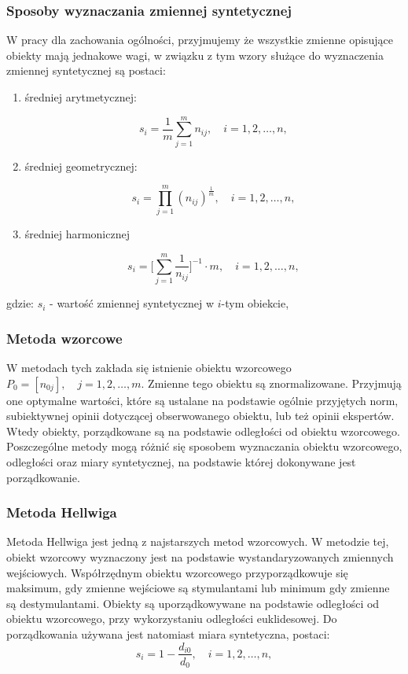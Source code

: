 \documentclass[12pt,a4paper]{report}
\begin{document}
\subsubsection{Sposoby wyznaczania zmiennej syntetycznej}
W pracy dla zachowania ogólności, przyjmujemy że wszystkie zmienne opisujące obiekty mają jednakowe wagi, w związku z tym wzory służące do wyznaczenia zmiennej syntetycznej są postaci:
\begin{enumerate}
\item średniej arytmetycznej:

$$
s_{i}=\frac{1}{m} \sum_{j=1}^{m} n_{ij},  \quad i=1, 2, \ldots, n,
$$

\item średniej geometrycznej:

$$
s_{i}=\prod_{j=1}^{m} (n_{ij})^{\frac{1}{m}}, \quad i=1, 2, \ldots, n,
$$

\item średniej harmonicznej

$$
s_{i}=\big[\sum_{j=1}^{m} \frac{1}{n_{ij}}\big]^{-1} \cdot m, \quad i=1, 2, \ldots, n,
$$

\end{enumerate}
gdzie:
$s_{i}$ - wartość zmiennej syntetycznej w $i$-tym obiekcie,

\subsubsection{Metoda wzorcowe}


W metodach tych zakłada się istnienie obiektu wzorcowego $P_{0}=[n_{0j}], \quad  j= 1,2,\ldots,m$. Zmienne tego obiektu są znormalizowane. Przyjmują one optymalne wartości, które są ustalane na podstawie ogólnie przyjętych norm, subiektywnej opinii dotyczącej obserwowanego obiektu, lub też opinii ekspertów. Wtedy obiekty, porządkowane są na podstawie odległości od obiektu wzorcowego. 
Poszczególne metody mogą różnić się sposobem wyznaczania obiektu wzorcowego, odległości oraz miary syntetycznej, na podstawie której dokonywane jest porządkowanie.

\subsubsection{Metoda Hellwiga}


Metoda Hellwiga jest jedną z najstarszych metod wzorcowych. W metodzie tej, obiekt wzorcowy wyznaczony jest na podstawie wystandaryzowanych zmiennych wejściowych. Współrzędnym obiektu wzorcowego przyporządkowuje się maksimum, gdy zmienne wejściowe są stymulantami lub minimum gdy zmienne są destymulantami. Obiekty są uporządkowywane na podstawie odległości od obiektu wzorcowego, przy wykorzystaniu odległości euklidesowej.
Do porządkowania używana jest natomiast miara syntetyczna, postaci: 
$$
s_i=1-\frac{d_{i0}}{d_{0}},\quad i=1, 2, \ldots, n ,
$$
\end{document}
